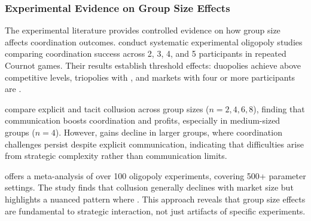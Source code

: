 \subsubsection*{Experimental Evidence on Group Size Effects}

The experimental literature provides controlled evidence on how group size affects coordination outcomes. \textcite{huck_two_2004} conduct systematic experimental oligopoly studies comparing coordination success across 2, 3, 4, and 5 participants in repeated Cournot games. Their results establish threshold effects: duopolies achieve  above competitive levels, triopolies  with , and markets with four or more participants are  \parencite[p. 435]{huck_two_2004}. %

\textcite{fonseca_explicit_2012} compare explicit and tacit collusion across group sizes ($n=2,4,6,8$), finding that communication boosts coordination and profits, especially in medium-sized groups ($n=4$). However, gains decline in larger groups, where coordination challenges persist despite explicit communication, indicating that difficulties arise from strategic complexity rather than communication limits.

\textcite{engel_how_2007} offers a meta-analysis of over 100 oligopoly experiments, covering 500+ parameter settings. The study finds that collusion generally declines with market size but highlights a nuanced pattern where . This approach reveals that group size effects are fundamental to strategic interaction, not just artifacts of specific experiments.

%

